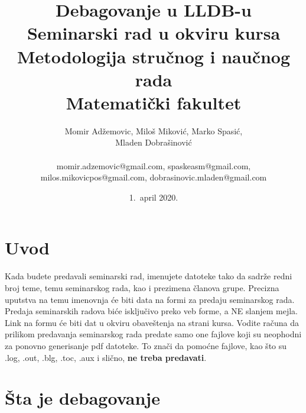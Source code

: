 \documentclass[a4paper]{article}
\begin{document}
\title{Debagovanje u LLDB-u\\ \small{Seminarski rad u okviru kursa\\Metodologija stručnog i naučnog rada\\ Matematički fakultet}}

\author{Momir Adžemovic, Miloš Miković, Marko Spasić,\\ Mladen Dobrašinović\\ \\ momir.adzemovic@gmail.com, spaskeasm@gmail.com,\\ milos.mikovicpos@gmail.com, dobrasinovic.mladen@gmail.com}

\date{1.~april 2020.}

\maketitle


\tableofcontents

\newpage

\section{Uvod}
\label{sec:uvod}

Kada budete predavali seminarski rad, imenujete datoteke tako da sadrže redni broj teme, temu seminarskog rada, kao i prezimena članova grupe. Precizna uputstva na temu imenovnja će biti data na formi za predaju seminarskog rada. Predaja seminarskih radova biće isključivo preko veb forme, a NE slanjem mejla. Link na formu će biti dat u okviru obaveštenja na strani kursa. Vodite računa da prilikom predavanja seminarskog rada predate samo one fajlove koji su neophodni za ponovno generisanje pdf datoteke. To znači da pomoćne fajlove, kao što su .log, .out, .blg, .toc, .aux i slično, \textbf{ne treba predavati}.

\section{Šta je debagovanje}
\label{sec:sta je debagovanje}
\end{document}
